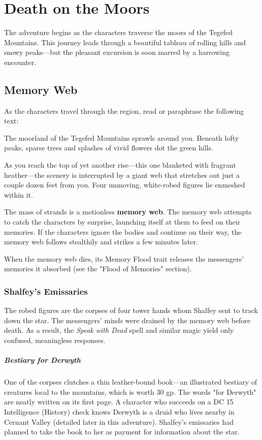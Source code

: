 \documentclass[10pt,a4paper,twoside,bg=print,twocolumn,openany,nodeprecatedcode]{dndbook}
\begin{document}
\section{Death on the Moors}
The adventure begins as the characters traverse the moors of the Tegefed Mountains. This journey leads through a beautiful tableau of rolling hills and snowy peaks—but the pleasant excursion is soon marred by a harrowing encounter.

\subsection{Memory Web}
As the characters travel through the region, read or paraphrase the following text:

\begin{DndReadAloud}{}
The moorland of the Tegefed Mountains sprawls around you. Beneath lofty peaks, sparse trees and splashes of vivid flowers dot the green hills.

As you reach the top of yet another rise—this one blanketed with fragrant heather—the scenery is interrupted by a giant web that stretches out just a couple dozen feet from you. Four unmoving, white-robed figures lie enmeshed within it.

\end{DndReadAloud}

The mass of strands is a motionless \textbf{memory web}. The memory web attempts to catch the characters by surprise, launching itself at them to feed on their memories. If the characters ignore the bodies and continue on their way, the memory web follows stealthily and strikes a few minutes later.

When the memory web dies, its Memory Flood trait releases the messengers' memories it absorbed (see the "Flood of Memories" section).

\subsubsection{Shalfey's Emissaries}
The robed figures are the corpses of four tower hands whom Shalfey sent to track down the star. The messengers' minds were drained by the memory web before death. As a result, the \textit{Speak with Dead} spell and similar magic yield only confused, meaningless responses.

\subparagraph{Bestiary for Derwyth}
One of the corpses clutches a thin leather-bound book—an illustrated bestiary of creatures local to the mountains, which is worth 30 gp. The words "for Derwyth" are neatly written on its first page. A character who succeeds on a DC 15 Intelligence (History) check knows Derwyth is a druid who lives nearby in Cernant Valley (detailed later in this adventure). Shalfey's emissaries had planned to take the book to her as payment for information about the star.
\end{document}
